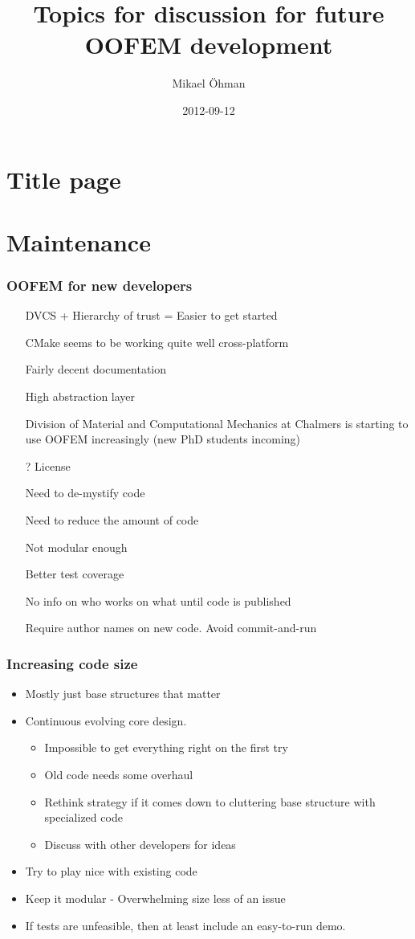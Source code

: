 \documentclass[11pt]{beamer} %
\title{Topics for discussion for future OOFEM development}
\author[Mikael \"Ohman]{Mikael \"Ohman}
\institute{Department of Applied Mechanics\\ Chalmers University of Technology}
\date{2012-09-12}
\begin{document}
\section{Title page}
\begin{frame}[plain]
 \titlepage
\end{frame}

\section{Maintenance}
\begin{frame}
 \frametitle{OOFEM for new developers}
\begin{itemize}
 \item[\smiley] DVCS + Hierarchy of trust = Easier to get started
 \item[\smiley] CMake seems to be working quite well cross-platform
 \item[\smiley] Fairly decent documentation
 \item[\smiley] High abstraction layer
 \item[\smiley] Division of Material and Computational Mechanics at Chalmers is starting to use OOFEM increasingly (new PhD students incoming)
 \item[?] License
\end{itemize}
\begin{itemize}
 \item[\frownie] Need to de-mystify code
 \item[\frownie] Need to reduce the amount of code
 \item[\frownie] Not modular enough
 \item[\frownie] Better test coverage
 \item[\frownie] No info on who works on what until code is published
 \item[\frownie] Require author names on new code. Avoid commit-and-run
\end{itemize}
\end{frame}

\begin{frame}
 \frametitle{Increasing code size}
\begin{itemize}
 \item Mostly just base structures that matter
 \item Continuous evolving core design.
  \begin{itemize}
    \item Impossible to get everything right on the first try
    \item Old code needs some overhaul
    \item Rethink strategy if it comes down to cluttering base structure with specialized code
    \item Discuss with other developers for ideas
  \end{itemize}
 \item Try to play nice with existing code
 \item Keep it modular - Overwhelming size less of an issue
 \item If tests are unfeasible, then at least include an easy-to-run demo.
\end{itemize}
\end{frame}
\end{document}
